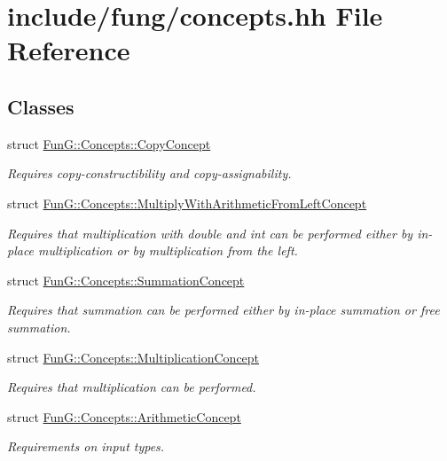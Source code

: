 \hypertarget{concepts_8hh}{}\section{include/fung/concepts.hh File Reference}
\label{concepts_8hh}
\subsection*{Classes}
\begin{DoxyCompactItemize}
\item 
struct \hyperlink{structFunG_1_1Concepts_1_1CopyConcept}{Fun\+G\+::\+Concepts\+::\+Copy\+Concept}
\begin{DoxyCompactList}\small\item\em Requires copy-\/constructibility and copy-\/assignability. \end{DoxyCompactList}\item 
struct \hyperlink{structFunG_1_1Concepts_1_1MultiplyWithArithmeticFromLeftConcept}{Fun\+G\+::\+Concepts\+::\+Multiply\+With\+Arithmetic\+From\+Left\+Concept}
\begin{DoxyCompactList}\small\item\em Requires that multiplication with double and int can be performed either by in-\/place multiplication or by multiplication from the left. \end{DoxyCompactList}\item 
struct \hyperlink{structFunG_1_1Concepts_1_1SummationConcept}{Fun\+G\+::\+Concepts\+::\+Summation\+Concept}
\begin{DoxyCompactList}\small\item\em Requires that summation can be performed either by in-\/place summation or free summation. \end{DoxyCompactList}\item 
struct \hyperlink{structFunG_1_1Concepts_1_1MultiplicationConcept}{Fun\+G\+::\+Concepts\+::\+Multiplication\+Concept}
\begin{DoxyCompactList}\small\item\em Requires that multiplication can be performed. \end{DoxyCompactList}\item 
struct \hyperlink{structFunG_1_1Concepts_1_1ArithmeticConcept}{Fun\+G\+::\+Concepts\+::\+Arithmetic\+Concept}
\begin{DoxyCompactList}\small\item\em Requirements on input types. \end{DoxyCompactList}\item 

\end{DoxyCompactItemize}
